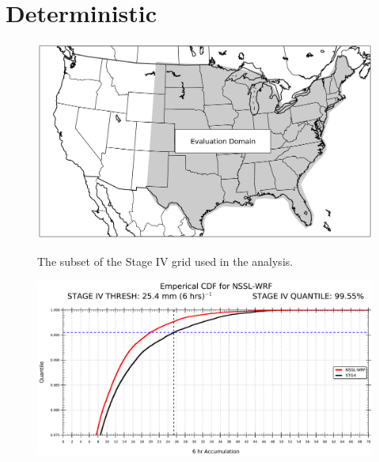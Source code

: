 

\chapter{Deterministic}
\label{deterministic}









\clearpage
\begin{figure}[cc]
    \centering
    \includegraphics[width=\textwidth,height=\textheight,keepaspectratio]{
    ./deterministic/figs/domain}\\
    \caption{The subset of the Stage IV grid used in the analysis.}
    \label{domain}
\end{figure}


\clearpage
\begin{figure}[cc]
    \centering
    \includegraphics[width=\textwidth,height=\textheight,keepaspectratio]{
    ./deterministic/figs/ecdf-nsslwrf-25mm.pdf}\\
    \caption{}
    \label{nssl_25quant}
\end{figure}


